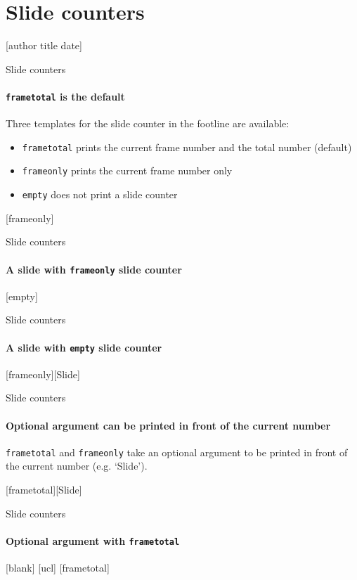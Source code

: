 \documentclass{beamer}
\begin{document}

\section{Slide counters}

[author title date]

\begin{frame}{Slide counters}
  \framesubtitle{\texttt{frametotal} is the default}
  Three templates for the slide counter in the footline are available:
  \begin{itemize}
    \item \texttt{frametotal} prints the current frame number and the total number (default)
    \item \texttt{frameonly} prints the current frame number only
    \item \texttt{empty} does not print a slide counter
  \end{itemize}
\end{frame}

[frameonly]
\begin{frame}{Slide counters}
  \framesubtitle{A slide with \texttt{frameonly} slide counter}
\end{frame}

[empty]
\begin{frame}{Slide counters}
  \framesubtitle{A slide with \texttt{empty} slide counter}
\end{frame}

[frameonly][Slide]
\begin{frame}{Slide counters}
  \framesubtitle{Optional argument can be printed in front of the current number}
  \texttt{frametotal} and \texttt{frameonly} take an optional argument
  to be printed in front of the current number (e.g. `Slide').
\end{frame}

[frametotal][Slide]
\begin{frame}{Slide counters}
  \framesubtitle{Optional argument with \texttt{frametotal}}
\end{frame}

[blank]
[ucl]
[frametotal]

\end{document}
